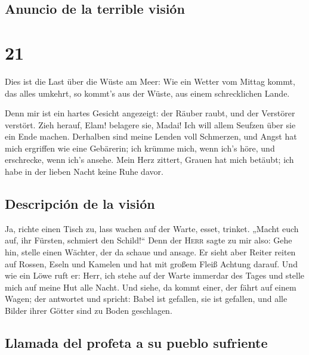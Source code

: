\hypertarget{anuncio-de-la-terrible-visiuxf3n}{%
\subsection{Anuncio de la terrible
visión}\label{anuncio-de-la-terrible-visiuxf3n}}

\hypertarget{section-20}{%
\section{21}\label{section-20}}

 Dies ist die Last über die Wüste am Meer: Wie ein Wetter
vom Mittag kommt, das alles umkehrt, so kommt's aus der Wüste, aus einem
schrecklichen Lande.

 Denn mir ist ein hartes Gesicht angezeigt: der Räuber
raubt, und der Verstörer verstört. Zieh herauf, Elam! belagere sie,
Madai! Ich will allem Seufzen über sie ein Ende machen. 
Derhalben sind meine Lenden voll Schmerzen, und Angst hat mich ergriffen
wie eine Gebärerin; ich krümme mich, wenn ich's höre, und erschrecke,
wenn ich's ansehe.  Mein Herz zittert, Grauen hat mich
betäubt; ich habe in der lieben Nacht keine Ruhe davor.

\hypertarget{descripciuxf3n-de-la-visiuxf3n}{%
\subsection{Descripción de la
visión}\label{descripciuxf3n-de-la-visiuxf3n}}

 Ja, richte einen Tisch zu, lass wachen auf der Warte,
esset, trinket. „Macht euch auf, ihr Fürsten, schmiert den Schild!{}``
 Denn der \textsc{Herr} sagte zu mir also: Gehe hin,
stelle einen Wächter, der da schaue und ansage.  Er sieht
aber Reiter reiten auf Rossen, Eseln und Kamelen und hat mit großem
Fleiß Achtung darauf.  Und wie ein Löwe ruft er: Herr, ich
stehe auf der Warte immerdar des Tages und stelle mich auf meine Hut
alle Nacht.  Und siehe, da kommt einer, der fährt auf
einem Wagen; der antwortet und spricht: Babel ist gefallen, sie ist
gefallen, und alle Bilder ihrer Götter sind zu Boden geschlagen.

\hypertarget{llamada-del-profeta-a-su-pueblo-sufriente}{%
\subsection{Llamada del profeta a su pueblo
sufriente}\label{llamada-del-profeta-a-su-pueblo-sufriente}}

